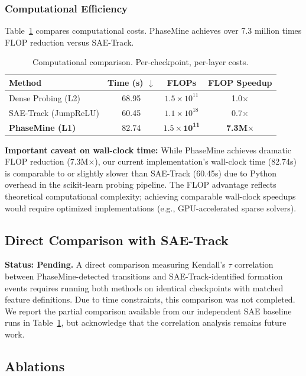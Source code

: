 \documentclass{article}
\begin{document}
\subsubsection{Computational Efficiency}

Table~\ref{tab:computational} compares computational costs. PhaseMine achieves over 7.3 million times FLOP reduction versus SAE-Track.

\begin{table}[t]
\caption{Computational comparison. Per-checkpoint, per-layer costs.}
\label{tab:computational}
\centering
\begin{tabular}{@{}lccc@{}}
\toprule
Method & Time (s) $\downarrow$ & FLOPs & FLOP Speedup \\
\midrule
Dense Probing (L2) & 68.95 & $1.5 \times 10^{11}$ & 1.0$\times$ \\
SAE-Track (JumpReLU) & 60.45 & $1.1 \times 10^{18}$ & 0.7$\times$ \\
\textbf{PhaseMine (L1)} & 82.74 & $\mathbf{1.5 \times 10^{11}}$ & \textbf{7.3M}$\times$ \\
\bottomrule
\end{tabular}
\end{table}

\textbf{Important caveat on wall-clock time:} While PhaseMine achieves dramatic FLOP reduction (7.3M$\times$), our current implementation's wall-clock time (82.74s) is comparable to or slightly slower than SAE-Track (60.45s) due to Python overhead in the scikit-learn probing pipeline. The FLOP advantage reflects theoretical computational complexity; achieving comparable wall-clock speedups would require optimized implementations (e.g., GPU-accelerated sparse solvers).

\subsection{Direct Comparison with SAE-Track}

\textbf{Status: Pending.} A direct comparison measuring Kendall's $\tau$ correlation between PhaseMine-detected transitions and SAE-Track-identified formation events requires running both methods on identical checkpoints with matched feature definitions. Due to time constraints, this comparison was not completed. We report the partial comparison available from our independent SAE baseline runs in Table~\ref{tab:computational}, but acknowledge that the correlation analysis remains future work.

\subsection{Ablations}
\end{document}
